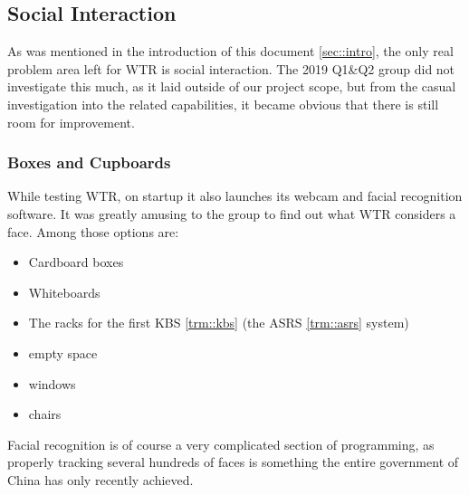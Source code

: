 \subsection{Social Interaction}
As was mentioned in the introduction of this document \ref{sec::intro}, the only real problem area left for WTR is social interaction.
The 2019 Q1\&Q2 group did not investigate this much, as it laid outside of our project scope, but from the casual investigation into the related capabilities, it became obvious that there is still room for improvement.

\subsubsection{Boxes and Cupboards}
While testing WTR, on startup it also launches its webcam and facial recognition software.
It was greatly amusing to the group to find out what WTR considers a face.
Among those options are:
\begin{itemize}
\item Cardboard boxes
\item Whiteboards
\item The racks for the first KBS \ref{trm::kbs} (the ASRS \ref{trm::asrs} system)
\item empty space
\item windows
\item chairs
\end{itemize}
Facial recognition is of course a very complicated section of programming, as properly tracking several hundreds of faces is something the entire government of China has only recently achieved.

